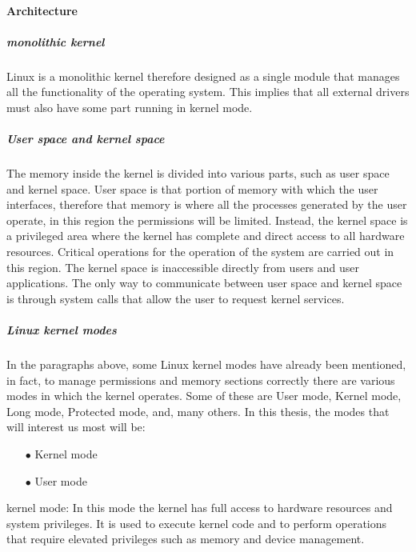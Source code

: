     \paragraph{Architecture}
    \subparagraph{monolithic kernel}
    Linux is a monolithic kernel therefore designed as a single module that manages all the functionality of the operating system.\newline
    This implies that all external drivers must also have some part running in kernel mode.\newline
    \subparagraph{User space and kernel space}
    The memory inside the kernel is divided into various parts, such as user space and kernel space.\newline
    User space is that portion of memory with which the user interfaces, therefore that memory is where all the processes generated by the user operate, in this region the permissions will be limited.\newline
    Instead, the kernel space is a privileged area where the kernel has complete and direct access to all hardware resources.\newline
    Critical operations for the operation of the system are carried out in this region.\newline
    The kernel space is inaccessible directly from users and user applications.\newline
    The only way to communicate between user space and kernel space is through system calls that allow the user to request kernel services.\newline
    \subparagraph{Linux kernel modes}
    In the paragraphs above, some Linux kernel modes have already been mentioned, in fact, to manage permissions and memory sections correctly there are various modes in which the kernel operates.\newline
    Some of these are User mode, Kernel mode, Long mode, Protected mode, and, many others.\newline
    In this thesis, the modes that will interest us most will be:\newline
    \begin{itemize}
        \item[$\bullet$] Kernel mode
        \item[$\bullet$] User mode
    \end{itemize}
    kernel mode: In this mode the kernel has full access to hardware resources and system privileges.\newline
    It is used to execute kernel code and to perform operations that require elevated privileges such as memory and device management.\newline
